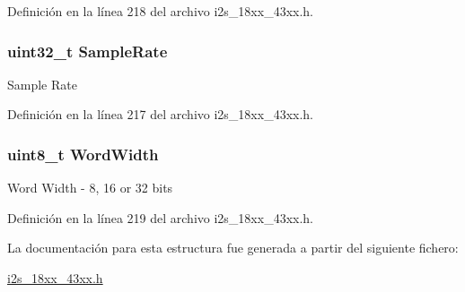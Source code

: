 Definición en la línea 218 del archivo i2s\+\_\+18xx\+\_\+43xx.\+h.

\subsubsection[{\texorpdfstring{Sample\+Rate}{SampleRate}}]{\setlength{\rightskip}{0pt plus 5cm}uint32\+\_\+t Sample\+Rate}\hypertarget{struct_i2_s___a_u_d_i_o___f_o_r_m_a_t___t_a930ec675cfdc1a0f18f3414583f7b950}{}\label{struct_i2_s___a_u_d_i_o___f_o_r_m_a_t___t_a930ec675cfdc1a0f18f3414583f7b950}
Sample Rate 

Definición en la línea 217 del archivo i2s\+\_\+18xx\+\_\+43xx.\+h.

\subsubsection[{\texorpdfstring{Word\+Width}{WordWidth}}]{\setlength{\rightskip}{0pt plus 5cm}uint8\+\_\+t Word\+Width}\hypertarget{struct_i2_s___a_u_d_i_o___f_o_r_m_a_t___t_af7bd178db9673a9753c589a27fa0495f}{}\label{struct_i2_s___a_u_d_i_o___f_o_r_m_a_t___t_af7bd178db9673a9753c589a27fa0495f}
Word Width -\/ 8, 16 or 32 bits 

Definición en la línea 219 del archivo i2s\+\_\+18xx\+\_\+43xx.\+h.



La documentación para esta estructura fue generada a partir del siguiente fichero\+:\begin{DoxyCompactItemize}
\item 
\hyperlink{i2s__18xx__43xx_8h}{i2s\+\_\+18xx\+\_\+43xx.\+h}\end{DoxyCompactItemize}
